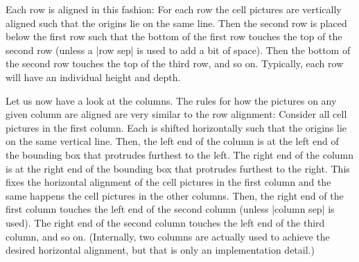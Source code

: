 Each row is aligned in this fashion: For each row the cell pictures
are vertically aligned such that the origins lie on the same
line. Then the second row is placed below the first row such that the
bottom of the first row touches the top of the second row (unless a
|row sep| is used to add a bit of space). Then the bottom of the
second row touches the top of the third row, and so on. Typically,
each row will have an individual height and depth.
%
\begin{codeexample}[]
\end{codeexample}

Let us now have a look at the columns. The rules for how the pictures on any
given column are aligned are very similar to the row alignment: Consider all
cell pictures in the first column. Each is shifted horizontally such that the
origins lie on the same vertical line. Then, the left end of the column is at
the left end of the bounding box that protrudes furthest to the left. The right
end of the column is at the right end of the bounding box that protrudes
furthest to the right. This fixes the horizontal alignment of the cell pictures
in the first column and the same happens the cell pictures in the other
columns. Then, the right end of the first column touches the left end of the
second column (unless |column sep| is used). The right end of the second column
touches the left end of the third column, and so on. (Internally, two columns
are actually used to achieve the desired horizontal alignment, but that is only
an implementation detail.)
%
\begin{codeexample}[]
\end{codeexample}

